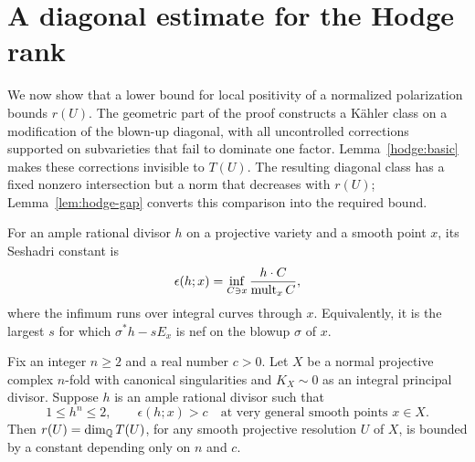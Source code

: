 \section{A diagonal estimate for the Hodge rank}\label{sec:diagonal}

We now show that a lower bound for local positivity of a normalized
polarization bounds $r(U)$.  The geometric part of the proof constructs a
K\"ahler class on a modification of the blown-up diagonal, with all
uncontrolled corrections supported on subvarieties that fail to dominate
one factor.  Lemma~\ref{hodge:basic} makes these corrections invisible to
$T(U)$.  The resulting diagonal class has a fixed nonzero intersection
but a norm that decreases with $r(U)$; Lemma~\ref{lem:hodge-gap} converts
this comparison into the required bound.

For an ample rational divisor $h$ on a projective variety and a smooth
point $x$, its Seshadri constant is
\[
 \epsilon(h;x)=\inf_{C\ni x}\frac{h\cdot C}{\operatorname{mult}_x C},
\]
where the infimum runs over integral curves through $x$.  Equivalently,
it is the largest $s$ for which $\sigma^*h-sE_x$ is nef on the blowup
$\sigma$ of $x$.

\begin{lemma}\label{lem:diagonal}
Fix an integer $n\ge2$ and a real number $c>0$.  Let $X$ be a normal
projective complex $n$-fold with canonical singularities and
$K_X\sim0$ as an integral principal divisor.  Suppose $h$ is an ample
rational divisor such that
\[
 1\le h^n\le2,
 \qquad \epsilon(h;x)>c
 \quad\text{at very general smooth points }x\in X.
\]
Then $r(U)=\dim_\mathbb Q T(U)$, for any smooth projective resolution $U$ of
$X$, is bounded by a constant depending only on $n$ and $c$.
\end{lemma}

